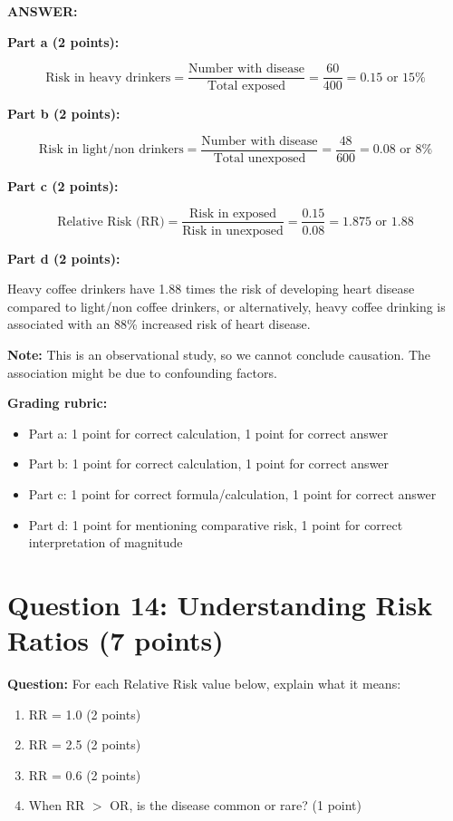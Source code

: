 \documentclass[11pt]{article}
\begin{document}
\textbf{ANSWER:}

\textbf{Part a (2 points):}

\[\text{Risk in heavy drinkers} = \frac{\text{Number with disease}}{\text{Total exposed}} = \frac{60}{400} = 0.15 \text{ or } 15\%\]

\textbf{Part b (2 points):}

\[\text{Risk in light/non drinkers} = \frac{\text{Number with disease}}{\text{Total unexposed}} = \frac{48}{600} = 0.08 \text{ or } 8\%\]

\textbf{Part c (2 points):}

\[\text{Relative Risk (RR)} = \frac{\text{Risk in exposed}}{\text{Risk in unexposed}} = \frac{0.15}{0.08} = 1.875 \text{ or } 1.88\]

\textbf{Part d (2 points):}

Heavy coffee drinkers have 1.88 times the risk of developing heart disease compared to light/non coffee drinkers, or alternatively, heavy coffee drinking is associated with an 88\% increased risk of heart disease.

\textbf{Note:} This is an observational study, so we cannot conclude causation. The association might be due to confounding factors.

\textbf{Grading rubric:}
\begin{itemize}
    \item Part a: 1 point for correct calculation, 1 point for correct answer
    \item Part b: 1 point for correct calculation, 1 point for correct answer
    \item Part c: 1 point for correct formula/calculation, 1 point for correct answer
    \item Part d: 1 point for mentioning comparative risk, 1 point for correct interpretation of magnitude
\end{itemize}

\vspace{0.3cm}
\noindent\hrulefill

\section*{Question 14: Understanding Risk Ratios (7 points)}

\textbf{Question:} For each Relative Risk value below, explain what it means:

\begin{enumerate}
    \item[a)] RR = 1.0 (2 points)
    \item[b)] RR = 2.5 (2 points)
    \item[c)] RR = 0.6 (2 points)
    \item[d)] When RR $>$ OR, is the disease common or rare? (1 point)
\end{enumerate}
\end{document}

